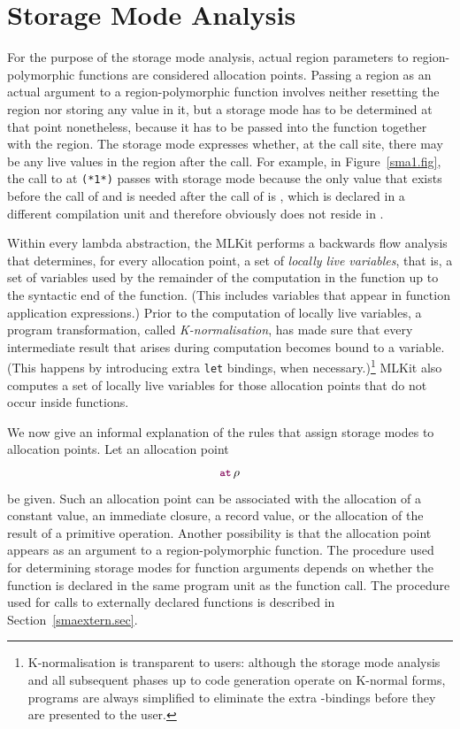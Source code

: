 \documentclass[12pt]{book}
\begin{document}
\section{Storage Mode Analysis}
\label{sma.sec}

For the purpose of the storage mode analysis, actual region parameters to
region-polymorphic functions are considered allocation points.  Passing a region
as an actual argument to a region-polymorphic function involves neither
resetting the region nor storing any value in it, but a storage mode has to be
determined at that point nonetheless, because it has to be passed into the
function together with the region. The storage mode expresses whether, at the
call site, there may be any live values in the region after the call. For
example, in Figure~\ref{sma1.fig}, the call to  at \lstinline{(*1*)}
passes  with storage mode  because the only value that exists
before the call of  and is needed after the call of  is
, which is declared in a different compilation unit and therefore
obviously does not reside in .

Within every lambda abstraction, the MLKit performs a backwards flow analysis
that determines, for every allocation point, a set of
%
%
%
{\em locally live variables}, that is, a set of variables used by the remainder
of the computation in the function up to the syntactic end of the
function. (This includes variables that appear in function application
expressions.) Prior to the computation of locally live variables, a program
transformation, called
%
%
\label{K-normal-form}%
%
{\em K-normalisation}, has made sure that every intermediate result that arises
during computation becomes bound to a variable. (This happens by introducing
extra \lstinline{let} bindings, when necessary.)\footnote{K-normalisation is
transparent to users: although the storage mode analysis and all subsequent
phases up to code generation operate on K-normal forms, programs are always
simplified to eliminate the extra -bindings before they are presented
to the user.}
%
MLKit also computes a set of locally live variables for those allocation points
that do not occur inside functions.

We now give an informal explanation of the rules that assign storage modes to
allocation points.  Let an allocation point
\begin{equation}
\label{allocpoint}\fw{at}\,\rho
\end{equation}
be given. Such an allocation point can be associated with the allocation of a
constant value, an immediate closure, a record value, or the allocation of the
result of a primitive operation. Another possibility is that the allocation
point appears as an argument to a region-polymorphic function. The procedure
used for determining storage modes for function arguments depends on whether the
function is declared in the same program unit as the function call. The
procedure used for calls to externally declared functions is described in
Section~\ref{smaextern.sec}.
\bigskip
\end{document}
